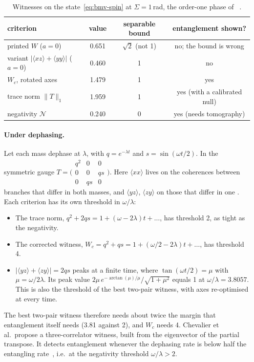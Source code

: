 \begin{table}[ht]\centering\small
\caption{Witnesses on the state~\eqref{eq:bmv-spin} at $\Sigma=1$\,rad, the order-one phase of~\cite{bose} .}\label{tab:bmv-w}
\begin{tabular}{@{}lccc@{}}\toprule
criterion & value & separable bound & entanglement shown?\\\midrule
printed $W$ ($a=0$) & 0.651 & $\sqrt2$ (not 1) & no; the bound is wrong\\
variant $|\langle xz\rangle+\langle yy\rangle|$ ($a=0$) & 0.460 & 1 & no\\
$W_c$, rotated axes & 1.479 & 1 & yes\\
trace norm $\|T\|_1$ & 1.959 & 1 & yes (with a calibrated null)\\
negativity $\mathcal N$ & 0.240 & 0 & yes (needs tomography)\\\bottomrule
\end{tabular}
\end{table}

\paragraph{Under dephasing.} Let each mass dephase at $\lambda$, with $q=e^{-\lambda t}$ and $s=\sin(\omega t/2)$. In the symmetric gauge
$T=\bigl(\begin{smallmatrix}q^2&0&0\\0&0&qs\\0&qs&0\end{smallmatrix}\bigr)$. Here $\langle xx\rangle$ lives on the coherences between
branches that differ in both masses, and $\langle yz\rangle$, $\langle zy\rangle$ on those that differ in one . Each criterion
has its own threshold in $\omega/\lambda$:
\begin{itemize}[nosep]
\item The trace norm, $q^2+2qs=1+(\omega-2\lambda)t+\dots$, has threshold 2, as tight as the negativity.
\item The corrected witness, $W_c=q^2+qs=1+(\omega/2-2\lambda)t+\dots$, has threshold 4.
\item $|\langle yz\rangle+\langle zy\rangle|=2qs$ peaks at a finite time, where $\tan(\omega t/2)=\mu$ with $\mu=\omega/2\lambda$. Its peak value
$2\mu\,e^{-\arctan(\mu)/\mu}/\sqrt{1+\mu^2}$ equals 1 at $\omega/\lambda=3.8057$. This is also the threshold of the best two-pair witness, with
axes re-optimised at every time.
\end{itemize}
The best two-pair witness therefore needs about twice the margin that entanglement itself needs (3.81 against 2), and $W_c$ needs 4.
Chevalier et al.\ propose a three-correlator witness, built from the eigenvector of the partial transpose. It detects entanglement whenever
the dephasing rate is below half the entangling rate~\cite{chevalier2020}, i.e.\ at the negativity threshold $\omega/\lambda>2$.

